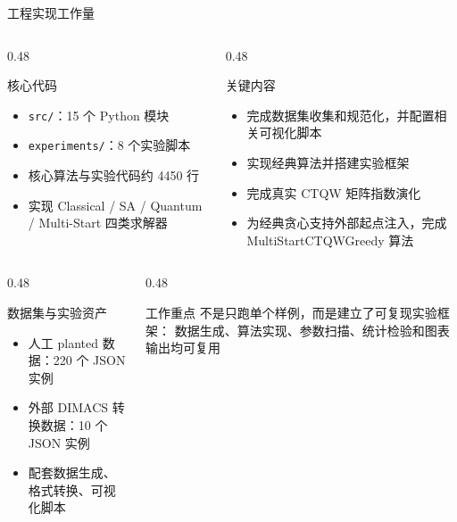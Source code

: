 \documentclass[aspectratio=169,10pt]{ctexbeamer}
\begin{document}
\begin{frame}{工程实现工作量}
  \begin{columns}[T,onlytextwidth]
    \begin{column}{0.48\textwidth}
      \begin{block}{核心代码}
        \begin{itemize}
          \item \texttt{src/}：15 个 Python 模块
          \item \texttt{experiments/}：8 个实验脚本
          \item 核心算法与实验代码约 4450 行
          \item 实现 Classical / SA / Quantum / Multi-Start 四类求解器
        \end{itemize}
      \end{block}
    \end{column}
    \begin{column}{0.48\textwidth}
      \begin{block}{关键内容}
        \begin{itemize}
          \item 完成数据集收集和规范化，并配置相关可视化脚本
          \item 实现经典算法并搭建实验框架
          \item 完成真实 CTQW 矩阵指数演化
          \item 为经典贪心支持外部起点注入，完成 MultiStartCTQWGreedy 算法
        \end{itemize}
      \end{block}
    \end{column}
  \end{columns}

  \vspace{0.3em}

  \begin{columns}[T,onlytextwidth]
    \begin{column}{0.48\textwidth}
      \begin{block}{数据集与实验资产}
        \begin{itemize}
          \item 人工 planted 数据：220 个 JSON 实例
          \item 外部 DIMACS 转换数据：10 个 JSON 实例
          \item 配套数据生成、格式转换、可视化脚本
        \end{itemize}
      \end{block}
    \end{column}
    \begin{column}{0.48\textwidth}
      \begin{alertblock}{工作重点}
        不是只跑单个样例，而是建立了可复现实验框架：
        数据生成、算法实现、参数扫描、统计检验和图表输出均可复用
      \end{alertblock}
    \end{column}
  \end{columns}
\end{frame}
\end{document}
